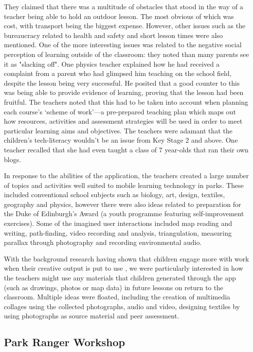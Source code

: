 They claimed that there was a multitude of obstacles that stood in the way of a teacher being able to hold an outdoor lesson. The most obvious of which was cost, with transport being the biggest expense. However, other issues such as the bureaucracy related to health and safety and short lesson times were also mentioned. One of the more interesting issues was related to the negative social perception of learning outside of the classroom: they noted than many parents see it as "slacking off". One physics teacher explained how he had received a complaint from a parent who had glimpsed him teaching on the school field, despite the lesson being very successful. He posited that a good counter to this was being able to provide evidence of learning, proving that the lesson had been fruitful. The teachers noted that this had to be taken into account when planning each course’s `scheme of work'---a pre-prepared teaching plan which maps out how resources, activities and assessment strategies will be used in order to meet particular learning aims and objectives. The teachers were adamant that the children’s tech-literacy wouldn’t be an issue from Key Stage 2 and above. One teacher recalled that she had even taught a class of 7 year-olds that ran their own blogs.

In response to the abilities of the application, the teachers created a large number of topics and activities well suited to mobile learning technology in parks. These included conventional school subjects such as biology, art, design, textiles, geography and physics, however there were also ideas related to preparation for the Duke of Edinburgh’s Award (a youth programme featuring self-improvement exercises). Some of the imagined user interactions included map reading and writing, path-finding, video recording and analysis, triangulation, measuring parallax through photography and recording environmental audio.

With the background research having shown that children engage more with work when their creative output is put to use \citep{TheNationalEnvironmentalEducationFoundation}, we were particularly interested in how the teachers might use any materials that children generated through the app (such as drawings, photos or map data) in future lessons on return to the classroom. Multiple ideas were floated, including the creation of multimedia collages using the collected photographs, audio and video, designing textiles by using photographs as source material and peer assessment.

\subsection{Park Ranger Workshop}

